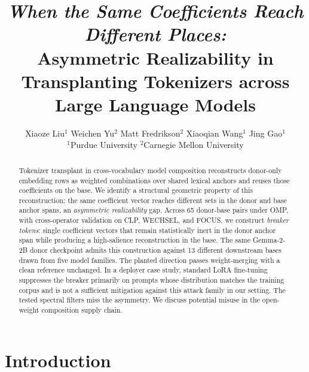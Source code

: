 \documentclass{article}
\title{\textit{When the Same Coefficients Reach Different Places:}\\Asymmetric Realizability in Transplanting Tokenizers across Large Language Models}
\author{%
  Xiaoze Liu$^1$ \quad Weichen Yu$^2$ \quad Matt Fredrikson$^2$ \quad Xiaoqian Wang$^1$ \quad Jing Gao$^1$\\
  $^1$Purdue University \quad $^2$Carnegie Mellon University
}
\theoremstyle{plain}
\theoremstyle{definition}
\theoremstyle{remark}
\begin{document}
\maketitle

\begin{abstract}
Tokenizer transplant in cross-vocabulary model composition reconstructs donor-only embedding rows as weighted combinations over shared lexical anchors and reuses those coefficients on the base. We identify a structural geometric property of this reconstruction: the same coefficient vector reaches different sets in the donor and base anchor spans, an \emph{asymmetric realizability} gap. Across 65 donor-base pairs under OMP, with cross-operator validation on CLP, WECHSEL, and FOCUS, we construct \textit{breaker tokens}: single coefficient vectors that remain statistically inert in the donor anchor span while producing a high-salience reconstruction in the base. The same Gemma-2-2B donor checkpoint admits this construction against 13 different downstream bases drawn from five model families. The planted direction passes weight-merging with a clean reference unchanged. In a deployer case study, standard LoRA fine-tuning suppresses the breaker primarily on prompts whose distribution matches the training corpus and is not a sufficient mitigation against this attack family in our setting. The tested spectral filters miss the asymmetry. We discuss potential misuse in the open-weight composition supply chain.
\end{abstract}


\section{Introduction}
\label{sec:intro}
\end{document}

